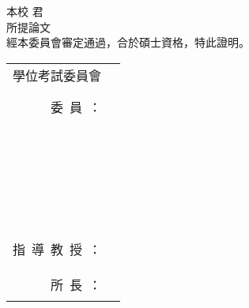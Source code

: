 \vspace{0.5cm}


\fontsize{20}{22}\selectfont
本校 \underline{\deptCname} \underline{\myCname}  君\\
所提論文 \uline{\cTitle} \\
經本委員會審定通過，合於碩士資格，特此證明。 \\

\fontsize{20}{16}\selectfont
\begin{tabular}{rp{}}
學位考試委員會 \\ & \\
委~員~：
	& \rule{0.6\textwidth}{1pt} \\
	& \\
	& \rule{0.6\textwidth}{1pt} \\
	& \\
	& \rule{0.6\textwidth}{1pt} \\
	& \\
	& \rule{0.6\textwidth}{1pt} \\
	& \\
指~導~教~授~： & \rule{0.6\textwidth}{1pt} \\
	& \\
所~長~： & \rule{0.6\textwidth}{1pt}
\end{tabular}

\vspace{1cm}
\begin{center}
\end{center}

\clearpage
\normalsize


%

